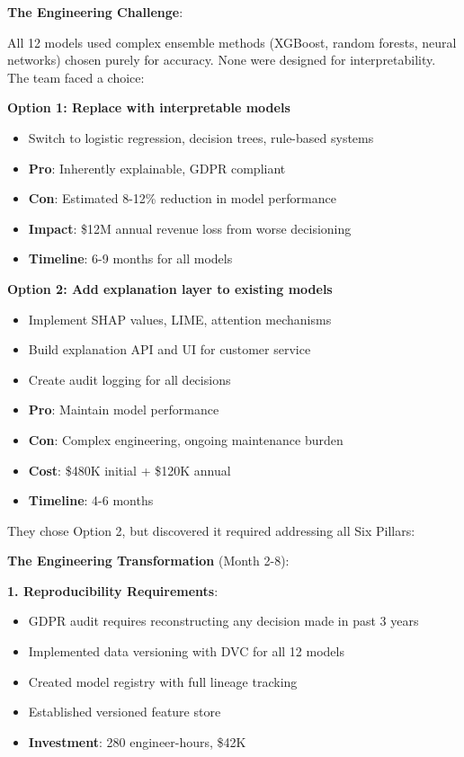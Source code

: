 \textbf{The Engineering Challenge}:

All 12 models used complex ensemble methods (XGBoost, random forests, neural networks) chosen purely for accuracy. None were designed for interpretability. The team faced a choice:

\textbf{Option 1: Replace with interpretable models}
\begin{itemize}
    \item Switch to logistic regression, decision trees, rule-based systems
    \item \textbf{Pro}: Inherently explainable, GDPR compliant
    \item \textbf{Con}: Estimated 8-12\% reduction in model performance
    \item \textbf{Impact}: \$12M annual revenue loss from worse decisioning
    \item \textbf{Timeline}: 6-9 months for all models
\end{itemize}

\textbf{Option 2: Add explanation layer to existing models}
\begin{itemize}
    \item Implement SHAP values, LIME, attention mechanisms
    \item Build explanation API and UI for customer service
    \item Create audit logging for all decisions
    \item \textbf{Pro}: Maintain model performance
    \item \textbf{Con}: Complex engineering, ongoing maintenance burden
    \item \textbf{Cost}: \$480K initial + \$120K annual
    \item \textbf{Timeline}: 4-6 months
\end{itemize}

They chose Option 2, but discovered it required addressing all Six Pillars:

\textbf{The Engineering Transformation} (Month 2-8):

\textbf{1. Reproducibility Requirements}:
\begin{itemize}
    \item GDPR audit requires reconstructing any decision made in past 3 years
    \item Implemented data versioning with DVC for all 12 models
    \item Created model registry with full lineage tracking
    \item Established versioned feature store
    \item \textbf{Investment}: 280 engineer-hours, \$42K
\end{itemize}

